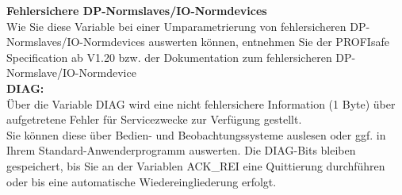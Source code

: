 \textbf{Fehlersichere DP-Normslaves/IO-Normdevices}\\
Wie Sie diese Variable bei einer Umparametrierung von fehlersicheren DP-Normslaves/IO-Normdevices auswerten können, entnehmen Sie der PROFIsafe Specification ab V1.20 bzw. der Dokumentation zum fehlersicheren DP-Normslave/IO-Normdevice\\

\textbf{DIAG:}\\
Über die Variable DIAG wird eine nicht fehlersichere Information (1 Byte) über aufgetretene Fehler für Servicezwecke zur Verfügung gestellt.\\
Sie können diese über Bedien- und Beobachtungssysteme auslesen oder ggf. in Ihrem Standard-Anwenderprogramm auswerten. Die DIAG-Bits bleiben gespeichert, bis Sie an der Variablen ACK\_REI eine Quittierung durchführen oder bis eine automatische Wiedereingliederung erfolgt.

